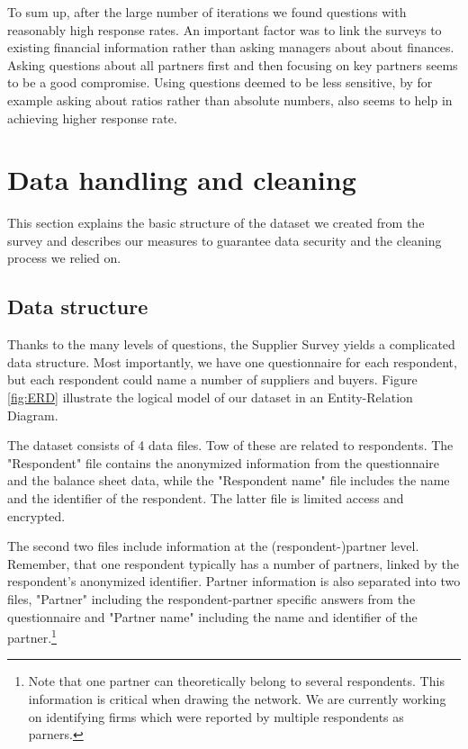 \usepackage{}\documentclass[final, dvipsnames, authoryear,12pt]{elsarticle}
\begin{document}
To sum up, after the large number of iterations we found questions with reasonably high response rates. An important factor was to link the surveys to existing financial information rather than asking managers about about finances. Asking questions about all partners first and then focusing on key partners seems to be a good compromise. Using questions deemed to be less sensitive, by for example asking about ratios rather than absolute numbers, also seems to help in achieving higher response rate. 

\section{Data handling and cleaning}
\label{sec:data_handling}

This section explains the basic structure of the dataset we created from the survey and describes our measures to guarantee data security and the cleaning process we relied on. 

\subsection{Data structure} 

Thanks to the many levels of questions, the Supplier Survey yields a complicated data structure. Most importantly, we have one questionnaire for each respondent, but each respondent could name a number of suppliers and buyers.  Figure \ref{fig:ERD} illustrate the logical model of our dataset in an Entity-Relation Diagram.



The dataset consists of 4 data files. Tow of these are related to respondents. The "Respondent" file contains the anonymized information from the questionnaire and the balance sheet data, while the "Respondent name" file includes the name and the identifier of the respondent. The latter file is limited access and encrypted. 

The second two files include information at the (respondent-)partner level. Remember, that one respondent typically has a number of partners, linked by the respondent's anonymized identifier. Partner information is also separated into two files, "Partner" including the respondent-partner specific answers from the questionnaire and "Partner name" including the name and identifier of the partner.\footnote{Note that one partner can theoretically belong to several respondents. This information is critical when drawing the network. We are currently working on identifying firms which were reported by multiple respondents as parners.}
\end{document}
